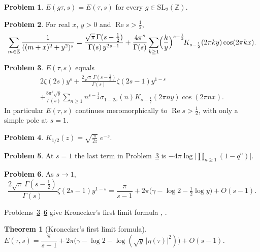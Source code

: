 \documentclass[reqno]{amsart}
\theoremstyle{definition}
\newtheorem{problem}{Problem}[section]
\theoremstyle{plain}
\newtheorem{theorem}{Theorem}[section]
\newcommand{\Z}{\mathbb{Z}}
\begin{document}
\begin{problem}\label{pr:E-inv}
\(E(g\tau, s) = E(\tau, s)\) for every \(g \in \mathrm{SL}_2(\Z)\).
\end{problem}

\begin{problem}\label{pr:poisson}
For real \(x\), \(y > 0\) and \(\operatorname{Re} s > \tfrac12\),
\[
  \sum_{m \in \Z} \frac{1}{((m + x)^2 + y^2)^{s}} = \frac{\sqrt\pi\, \Gamma(s - \frac12)}{\Gamma(s)\, y^{2s-1}} + \frac{4\pi^s}{\Gamma(s)} \sum_{k \ge 1} \Bigl(\frac{k}{y}\Bigr)^{s - \frac12} \! K_{s - \frac12}(2\pi k y) \cos(2\pi k x) .
\]
\end{problem}

\begin{problem}\label{pr:fourier}
\(E(\tau, s)\) equals
\begin{multline*}
  2\zeta(2s) y^s + \frac{2\sqrt\pi\, \Gamma(s - \frac12)}{\Gamma(s)} \zeta(2s - 1) y^{1-s} \\
  + \frac{8\pi^s \sqrt y}{\Gamma(s)} \sum_{n \ge 1} n^{s - \frac12} \sigma_{1 - 2s}(n) K_{s - \frac12}(2\pi n y) \cos(2\pi n x) .
\end{multline*}
In particular \(E(\tau, s)\) continues meromorphically to \(\operatorname{Re} s > \tfrac12\), with only a simple pole at \(s = 1\).
\end{problem}

\begin{problem}\label{pr:K-half}
\(K_{1/2}(z) = \sqrt{\frac{\pi}{2z}}\; e^{-z}\).
\end{problem}

\begin{problem}\label{pr:q-terms}
At \(s = 1\) the last term in Problem~\ref{pr:fourier} is \(-4\pi \log \bigl\lvert \prod_{n \ge 1} (1 - q^n) \bigr\rvert\).
\end{problem}

\begin{problem}\label{pr:const}
As \(s \to 1\),
\[
  \frac{2\sqrt\pi\, \Gamma(s - \frac12)}{\Gamma(s)} \zeta(2s - 1) y^{1-s} = \frac{\pi}{s - 1} + 2\pi\bigl(\gamma - \log 2 - \tfrac12 \log y\bigr) + O(s - 1) .
\]
\end{problem}

Problems~\ref{pr:fourier}--\ref{pr:const} give Kronecker's first limit formula \cite{We}, \cite[Ch.~20, 21]{La}.

\begin{theorem}[Kronecker's first limit formula]\label{thm:klf}
\(E(\tau, s) = \dfrac{\pi}{s - 1} + 2\pi\bigl(\gamma - \log 2 - \log(\sqrt y\, \lvert\eta(\tau)\rvert^2)\bigr) + O(s - 1)\).
\end{theorem}
\end{document}
